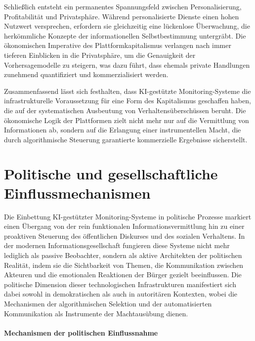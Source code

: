 Schließlich entsteht ein permanentes Spannungsfeld zwischen Personalisierung, Profitabilität und Privatsphäre. Während personalisierte Dienste einen hohen Nutzwert versprechen, erfordern sie gleichzeitig eine lückenlose Überwachung, die herkömmliche Konzepte der informationellen Selbstbestimmung untergräbt. Die ökonomischen Imperative des Plattformkapitalismus verlangen nach immer tieferen Einblicken in die Privatsphäre, um die Genauigkeit der Vorhersagemodelle zu steigern, was dazu führt, dass ehemals private Handlungen zunehmend quantifiziert und kommerzialisiert werden.

Zusammenfassend lässt sich festhalten, dass \ac{KI}-gestützte Monitoring-Systeme die infrastrukturelle Voraussetzung für eine Form des Kapitalismus geschaffen haben, die auf der systematischen Ausbeutung von Verhaltensüberschüssen beruht. Die ökonomische Logik der Plattformen zielt nicht mehr nur auf die Vermittlung von Informationen ab, sondern auf die Erlangung einer instrumentellen Macht, die durch algorithmische Steuerung garantierte kommerzielle Ergebnisse sicherstellt.
\section{Politische und gesellschaftliche Einflussmechanismen}

Die Einbettung \ac{KI}-gestützter Monitoring-Systeme in politische Prozesse markiert einen Übergang von der rein funktionalen Informationsvermittlung hin zu einer proaktiven Steuerung des öffentlichen Diskurses und des sozialen Verhaltens. In der modernen Informationsgesellschaft fungieren diese Systeme nicht mehr lediglich als passive Beobachter, sondern als aktive Architekten der politischen Realität, indem sie die Sichtbarkeit von Themen, die Kommunikation zwischen Akteuren und die emotionalen Reaktionen der Bürger gezielt beeinflussen. Die politische Dimension dieser technologischen Infrastrukturen manifestiert sich dabei sowohl in demokratischen als auch in autoritären Kontexten, wobei die Mechanismen der algorithmischen Selektion und der automatisierten Kommunikation als Instrumente der Machtausübung dienen.

\paragraph{Mechanismen der politischen Einflussnahme}

